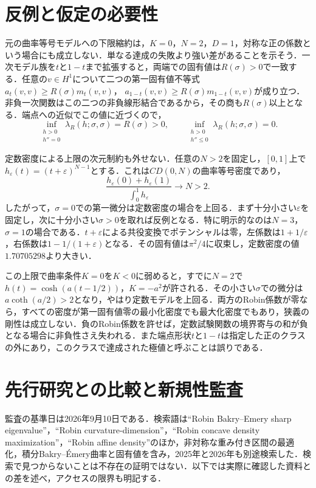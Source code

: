 \documentclass[12pt]{amsart}
\theoremstyle{definition}
\theoremstyle{remark}
\numberwithin{equation}{section}
\begin{document}
\section{反例と仮定の必要性}
元の曲率等号モデルへの下限縮約は，$K=0$，$N=2$，$D=1$，対称な正の係数という場合にも成立しない．単なる達成の失敗より強い差があることを示そう．一次モデル族を$t$と$1-t$まで拡張すると，両端での固有値は$R(\sigma)>0$で一致する．任意の$v\in H^1$について二つの第一固有値不等式
$a_t(v,v)\ge R(\sigma)m_t(v,v)$，
$a_{1-t}(v,v)\ge R(\sigma)m_{1-t}(v,v)$が成り立つ．非負一次関数はこの二つの非負線形結合であるから，その商も$R(\sigma)$以上となる．端点への近似でこの値に近づくので，
\[
 \inf_{\substack{h>0\\h''=0}}\lambda_R(h;\sigma,\sigma)=R(\sigma)>0,
 \qquad
 \inf_{\substack{h>0\\h''\le0}}\lambda_R(h;\sigma,\sigma)=0.
\]

定数密度による上限の次元制約も外せない．任意の$N>2$を固定し，$[0,1]$上で
$h_\varepsilon(t)=(t+\varepsilon)^{N-1}$とする．これは$CD(0,N)$の曲率等号密度であり，
\[
 \frac{h_\varepsilon(0)+h_\varepsilon(1)}{\int_0^1h_\varepsilon}
 \longrightarrow N>2.
\]
したがって，$\sigma=0$での第一微分は定数密度の場合を上回る．まず十分小さい$\varepsilon$を固定し，次に十分小さい$\sigma>0$を取れば反例となる．特に明示的なのは$N=3$，$\sigma=1$の場合である．$t+\varepsilon$による共役変換でポテンシャルは零，左係数は$1+1/\varepsilon$，右係数は$1-1/(1+\varepsilon)$となる．その固有値は$\pi^2/4$に収束し，定数密度の値$1.70705298$より大きい．

この上限で曲率条件$K=0$を$K<0$に弱めると，すでに$N=2$で
$h(t)=\cosh(a(t-1/2))$，$K=-a^2$が許される．その小さい$\sigma$での微分は
$a\coth(a/2)>2$となり，やはり定数モデルを上回る．両方のRobin係数が零なら，すべての密度が第一固有値零の最小化密度でも最大化密度でもあり，狭義の剛性は成立しない．負のRobin係数を許せば，定数試験関数の境界寄与の和が負となる場合に非負性さえ失われる．また端点形状$t$と$1-t$は指定した正のクラスの外にあり，このクラスで達成された極値と呼ぶことは誤りである．

\section{先行研究との比較と新規性監査}
監査の基準日は2026年9月10日である．検索語は``Robin Bakry--Emery sharp eigenvalue''，``Robin curvature-dimension''，``Robin concave density maximization''，``Robin affine density''のほか，非対称な重み付き区間の最適化，積分Bakry--\'Emery曲率と固有値を含み，2025年と2026年も別途検索した．検索で見つからないことは不存在の証明ではない．以下では実際に確認した資料との差を述べ，アクセスの限界も明記する．
\end{document}

